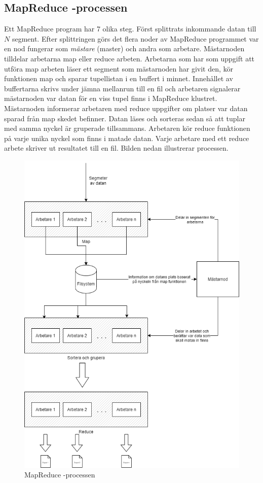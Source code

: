 \subsection{MapReduce -processen}

Ett MapReduce program har 7 olika steg. Först splittrats inkommande datan till $N$ segment. Efter splittringen
görs det flera noder av MapReduce programmet var en nod fungerar som \textit{mästare} (master) och andra
som arbetare. Mästarnoden tilldelar arbetarna map eller reduce arbeten. Arbetarna som har som uppgift att utföra map arbeten
läser ett segment som mästarnoden har givit den, kör funktionen map och sparar tupellistan i en buffert i minnet.
Innehållet av buffertarna skrivs under jämna mellanrun till en fil och arbetaren signalerar mästarnoden var datan för en viss
tupel finns i MapReduce klustret. Mästarnoden informerar arbetaren med reduce uppgifter om platser var datan sparad från map skedet
befinner. Datan läses och sorteras sedan så att tuplar med samma nyckel är gruperade tillsammans. Arbetaren kör reduce funktionen på varje
unika nyckel som finns i matade datan. Varje arbetare med ett reduce arbete skriver ut resultatet till en fil. Bilden nedan illustrerar processen.

\begin{figure}[h]
    \centering
    \includegraphics[scale=0.5]{img/map-reduce.png}
    \caption{MapReduce -processen}
    \label{fig:mesh1}
\end{figure}

